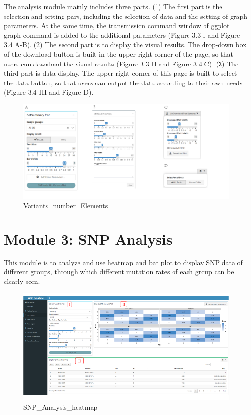 \documentclass[
]{book}
\theoremstyle{definition}
\theoremstyle{definition}
\theoremstyle{definition}
\theoremstyle{definition}
\theoremstyle{remark}
\begin{document}
The analysis module mainly includes three parts. (1) The first part is the selection and setting part, including the selection of data and the setting of graph parameters. At the same time, the transmission command window of ggplot graph command is added to the additional parameters (Figure 3.3-I and Figure 3.4 A-B). (2) The second part is to display the visual results. The drop-down box of the download button is built in the upper right corner of the page, so that users can download the visual results (Figure 3.3-II and Figure 3.4-C). (3) The third part is data display. The upper right corner of this page is built to select the data button, so that users can output the data according to their own needs (Figure 3.4-III and Figure-D).

\begin{figure}
\includegraphics[width=1\linewidth]{figure/1.Variants_numbers_Support} \caption{Variants_number_Elements}\label{fig:unnamed-chunk-9}
\end{figure}

\hypertarget{module-3-snp-analysis}{%
\section{Module 3: SNP Analysis}\label{module-3-snp-analysis}}

This module is to analyze and use heatmap and bar plot to display SNP data of different groups, through which different mutation rates of each group can be clearly seen.

\begin{figure}
\includegraphics[width=1\linewidth]{figure/2.SNP_Analysis_heatmap_1} \caption{SNP_Analysis_heatmap}\label{fig:unnamed-chunk-10}
\end{figure}
\end{document}

